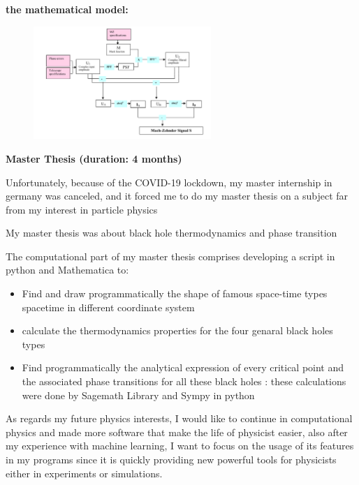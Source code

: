 \documentclass[11pt, a4paper]{awesome-cv}
\begin{document}
\begin{cvletter}
\textbf{\color{blue} the mathematical model: }

\begin{figure}[h]
	\centering
	\includegraphics[width=0.6\textwidth]{figs/svg.png}
\end{figure}

\textbf{Master Thesis (duration: 4 months) 
}

Unfortunately, because of the COVID-19 lockdown, my master internship in germany was canceled, and it forced me to do my master thesis on a subject far from my interest in particle physics 

My master thesis was about black hole thermodynamics and phase transition 

The computational part of my master thesis comprises developing a script in python and Mathematica to:  

\begin{itemize}
\item Find and draw programmatically the shape of famous space-time types spacetime in different coordinate system 
\item calculate the thermodynamics properties for the four genaral black holes types  
\item Find programmatically the analytical expression of every critical point and the associated phase transitions for all these black holes : these calculations were done by Sagemath Library and Sympy in python 
\end{itemize}



As regards my future physics interests, I would like to continue in computational physics and made more software that make the life of physicist easier, also after my experience with machine learning, I want to focus on the usage of its features in my programs since it is quickly providing new powerful tools for physicists either in experiments or simulations. 


\end{cvletter}


\end{document}
